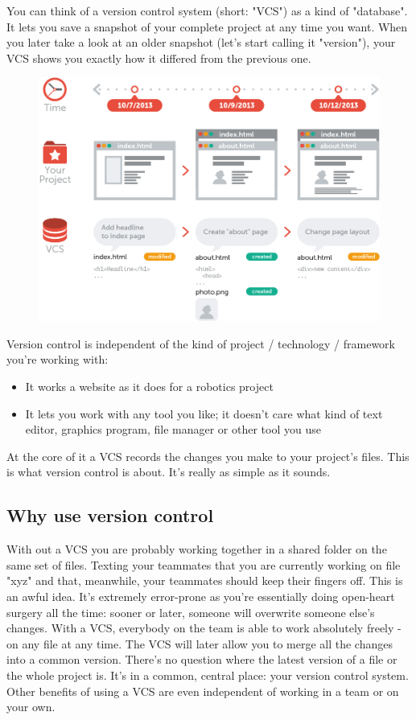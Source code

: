 \documentclass{article}
\begin{document}
    You can think of a version control system (short: "VCS") as a kind of "database". It lets you save a snapshot of your complete project at any time you want. When you later take a look at an older snapshot (let's start calling it "version"), your VCS shows you exactly how it differed from the previous one.
    \begin{figure}[hp]
    \centering
    \includegraphics[width=4.5in]{images/what_is_vcs.png}
    \end{figure}
    \newline
    Version control is independent of the kind of project / technology / framework you're working with:
    \begin{itemize}
        \item It works a website as it does for a robotics project
        \item It lets you work with any tool you like; it doesn't care what kind of text editor, graphics program, file manager or other tool you use
    \end{itemize}
    At the core of it a VCS records the changes you make to your project's files. This is what version control is about. It's really as simple as it sounds.
\subsection{Why use version control}
    
    With out a VCS you are probably working together in a shared folder on the same set of files. Texting your teammates that you are currently working on file "xyz" and that, meanwhile, your teammates should keep their fingers off. This is an awful idea. It's extremely error-prone as you're essentially doing open-heart surgery all the time: sooner or later, someone will overwrite someone else's changes.
    \newline\newline
    With a VCS, everybody on the team is able to work absolutely freely - on any file at any time. The VCS will later allow you to merge all the changes into a common version. There's no question where the latest version of a file or the whole project is. It's in a common, central place: your version control system.
    \newline\newline
    Other benefits of using a VCS are even independent of working in a team or on your own.
    
\end{document}
